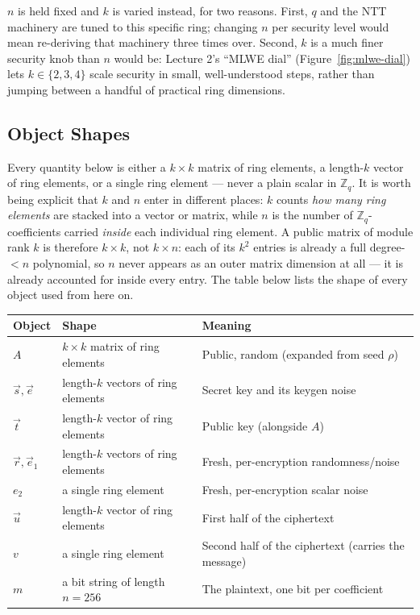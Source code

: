 $n$ is held fixed and $k$ is varied instead, for two reasons. First, $q$ and the NTT machinery are tuned to this specific ring; changing $n$ per security level would mean re-deriving that machinery three times over. Second, $k$ is a much finer security knob than $n$ would be: Lecture 2's ``MLWE dial'' (Figure~\ref{fig:mlwe-dial}) lets $k\in\{2,3,4\}$ scale security in small, well-understood steps, rather than jumping between a handful of practical ring dimensions.

\subsection{Object Shapes}
\label{sec:L3:dimension-bookkeeping}

Every quantity below is either a $k\times k$ matrix of ring elements, a length-$k$ vector of ring elements, or a single ring element --- never a plain scalar in $\mathbb{Z}_q$. It is worth being explicit that $k$ and $n$ enter in different places: $k$ counts \emph{how many ring elements} are stacked into a vector or matrix, while $n$ is the number of $\mathbb{Z}_q$-coefficients carried \emph{inside} each individual ring element. A public matrix of module rank $k$ is therefore $k\times k$, not $k\times n$: each of its $k^2$ entries is already a full degree-${<}n$ polynomial, so $n$ never appears as an outer matrix dimension at all --- it is already accounted for inside every entry. The table below lists the shape of every object used from here on.

\begin{center}
\renewcommand{\arraystretch}{1.3}
\begin{tabular}{|l|l|l|}
\hline
\textbf{Object} & \textbf{Shape} & \textbf{Meaning} \\
\hline
$A$ & $k \times k$ matrix of ring elements & Public, random (expanded from seed $\rho$) \\
$\vec s, \vec e$ & length-$k$ vectors of ring elements & Secret key and its keygen noise \\
$\vec t$ & length-$k$ vector of ring elements & Public key (alongside $A$) \\
$\vec r, \vec e_1$ & length-$k$ vectors of ring elements & Fresh, per-encryption randomness/noise \\
$e_2$ & a single ring element & Fresh, per-encryption scalar noise \\
$\vec u$ & length-$k$ vector of ring elements & First half of the ciphertext \\
$v$ & a single ring element & Second half of the ciphertext (carries the message) \\
$m$ & a bit string of length $n=256$ & The plaintext, one bit per coefficient \\
\hline
\end{tabular}
\end{center}

